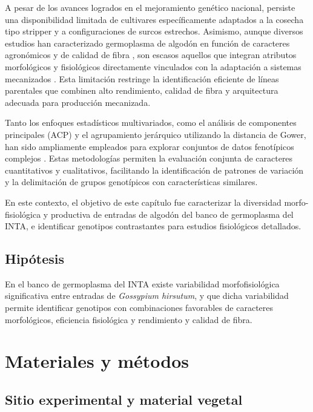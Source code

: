 \documentclass[12pt,oneside]{reedthesis}
\begin{document}
A pesar de los avances logrados en el mejoramiento genético nacional, persiste una disponibilidad limitada de cultivares específicamente adaptados a la cosecha tipo stripper y a configuraciones de surcos estrechos. Asimismo, aunque diversos estudios han caracterizado germoplasma de algodón en función de caracteres agronómicos y de calidad de fibra \autocite{royo1998,royo2003,klein2022,klein2011}, son escasos aquellos que integran atributos morfológicos y fisiológicos directamente vinculados con la adaptación a sistemas mecanizados \autocite{diaz2011}. Esta limitación restringe la identificación eficiente de líneas parentales que combinen alto rendimiento, calidad de fibra y arquitectura adecuada para producción mecanizada.

Tanto los enfoques estadísticos multivariados, como el análisis de componentes principales (ACP) y el agrupamiento jerárquico utilizando la distancia de Gower, han sido ampliamente empleados para explorar conjuntos de datos fenotípicos complejos \autocite{spoljaric2018,sarwar2021,klein2022,ullah2022,mangi2024,anwar2025}. Estas metodologías permiten la evaluación conjunta de caracteres cuantitativos y cualitativos, facilitando la identificación de patrones de variación y la delimitación de grupos genotípicos con características similares.

En este contexto, el objetivo de este capítulo fue caracterizar la diversidad morfo-fisiológica y productiva de entradas de algodón del banco de germoplasma del INTA, e identificar genotipos contrastantes para estudios fisiológicos detallados.

\subsection{Hipótesis}\label{hipuxf3tesis}

En el banco de germoplasma del INTA existe variabilidad morfofisiológica significativa entre entradas de \emph{Gossypium hirsutum}, y que dicha variabilidad permite identificar genotipos con combinaciones favorables de caracteres morfológicos, eficiencia fisiológica y rendimiento y calidad de fibra.

\section{Materiales y métodos}\label{materiales-y-muxe9todos}

\subsection{Sitio experimental y material vegetal}\label{sitio-experimental-y-material-vegetal}
\end{document}
